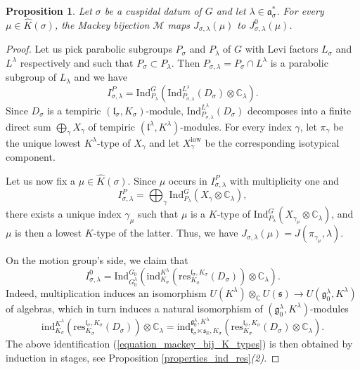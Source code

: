 \documentclass{amsart}
\newtheorem{proposition}[theorem]{Proposition}
\theoremstyle{definition}
\begin{document}
\begin{proposition}\label{MackeyBijDiff}
    Let $\sigma$ be a cuspidal datum of $G$ and let $\lambda \in \mathfrak{a}^*_\sigma$. For every $\mu \in \widehat{K}(\sigma)$, the Mackey bijection $\mathcal{M}$ maps $J_{\sigma,\lambda}(\mu)$ to $J^0_{\sigma,\lambda}(\mu)$.
\end{proposition}

\begin{proof}
    Let us pick parabolic subgroups $P_\sigma$ and $P_\lambda$ of $G$ with Levi factors $L_\sigma$ and $L^\lambda$ respectively and such that $P_\sigma \subset P_\lambda$. Then $P_{\sigma,\lambda} = P_\sigma \cap L^\lambda$ is a parabolic subgroup of $L_\lambda$ and we have
    \[I^P_{\sigma,\lambda} = \mathrm{Ind}_{P_\lambda}^{G}\left( \mathrm{Ind}^{L^\lambda}_{P_{\sigma,\lambda}}(D_{\sigma}) \otimes \mathbb{C}_\lambda\right).\]
    Since $D_{\sigma}$ is a tempiric $(\mathfrak{l}_\sigma,K_\sigma)$-module, $\mathrm{Ind}^{L^\lambda}_{P_{\sigma,\lambda}}(D_{\sigma})$ decomposes into a finite direct sum $\bigoplus_\gamma X_\gamma$ of tempiric $(\mathfrak{l}^\lambda,K^\lambda)$-modules. For every index $\gamma$, let $\pi_\gamma$ be the unique lowest $K^\lambda$-type of $X_\gamma$ and let $X_\gamma^\mathrm{low}$ be the corresponding isotypical component.

    Let us now fix a $\mu \in \widehat{K}(\sigma)$. Since $\mu$ occurs in $I^P_{\sigma,\lambda}$ with multiplicity one and
    \[I^P_{\sigma,\lambda} = \bigoplus_\gamma \mathrm{Ind}_{P_\lambda}^{G}(X_{\gamma} \otimes \mathbb{C}_\lambda),\]
    there exists a unique index $\gamma_\mu$ such that $\mu$ is a $K$-type of $\mathrm{Ind}_{P_\lambda}^{G}(X_{\gamma_\mu}\otimes \mathbb{C}_\lambda)$, and $\mu$ is then a lowest $K$-type of the latter. Thus, we have $J_{\sigma,\lambda}(\mu) = J(\pi_{\gamma_\mu},\lambda)$.

    On the motion group's side, we claim that
    \begin{equation}\label{equation_mackey_bij_K_types}
        I^0_{\sigma,\lambda} = \mathrm{Ind}_{G_0^\lambda}^{G_0}\!\left(\mathrm{ind}^{K^\lambda}_{K_\sigma}\!\left(\mathrm{res}_{K_\sigma}^{\mathfrak{l}_\sigma,K_\sigma}(D_\sigma)\right) \otimes \mathbb{C}_\lambda \right).
    \end{equation}
    Indeed, multiplication induces an isomorphism $U(K^\lambda) \otimes_\mathbb{C}U(\mathfrak{s}) \to U(\mathfrak{g}_0^\lambda,K^\lambda)$ of algebras, which in turn induces a natural isomorphism of $(\mathfrak{g}_0^\lambda,K^\lambda)$-modules
    \begin{equation*}
    \mathrm{ind}^{K^\lambda}_{K_\sigma}\!\left(\mathrm{res}_{K_\sigma}^{\mathfrak{l}_\sigma,K_\sigma}(D_\sigma)\right) \otimes \mathbb{C}_\lambda = \mathrm{ind}^{\mathfrak{g}_0^\lambda,K^\lambda}_{\mathfrak{k}_\sigma \ltimes \mathfrak{s}_\mathbb{R},K_\sigma}\!\left( \mathrm{res}_{K_\sigma}^{\mathfrak{l}_\sigma,K_\sigma}(D_\sigma)\otimes \mathbb{C}_\lambda\right).\end{equation*}
    The above identification (\ref{equation_mackey_bij_K_types}) is then obtained by induction in stages, see Proposition \ref{properties_ind_res}\textit{(2)}.
    

\end{proof}
\end{document}
